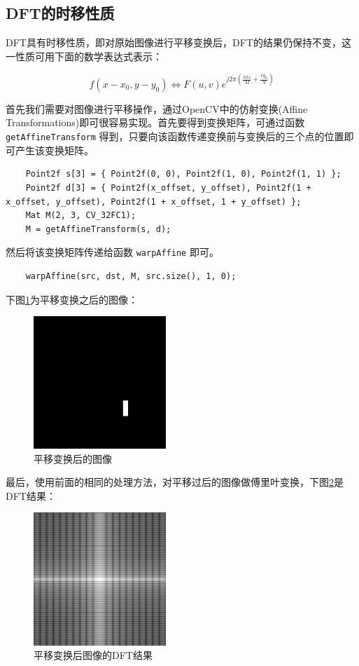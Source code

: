 \documentclass[hyperref,UTF8]{ctexart}
\begin{document}
\subsection{DFT的时移性质}


DFT具有时移性质，即对原始图像进行平移变换后，DFT的结果仍保持不变，这一性质可用下面的数学表达式表示：

\begin{equation}
f(x-x_0,y-y_0) \Leftrightarrow F(u,v)e^{j2 \pi (\frac{ux_0}{M} + \frac{vy_0}{N})}
\end{equation}

首先我们需要对图像进行平移操作，通过OpenCV中的仿射变换(Affine Transformations)即可很容易实现。首先要得到变换矩阵，可通过函数\lstinline{getAffineTransform} 得到，只要向该函数传递变换前与变换后的三个点的位置即可产生该变换矩阵。

\begin{lstlisting}
	Point2f s[3] = { Point2f(0, 0), Point2f(1, 0), Point2f(1, 1) };
	Point2f d[3] = { Point2f(x_offset, y_offset), Point2f(1 + x_offset, y_offset), Point2f(1 + x_offset, 1 + y_offset) };
	Mat M(2, 3, CV_32FC1);
	M = getAffineTransform(s, d);
\end{lstlisting}

然后将该变换矩阵传递给函数 \lstinline{warpAffine} 即可。

\begin{lstlisting}
	warpAffine(src, dst, M, src.size(), 1, 0);
\end{lstlisting}

下图\ref{fig:shift}为平移变换之后的图像：

\begin{figure}[H]
\centering
\includegraphics[width=5cm]{shift.png}
\caption{平移变换后的图像}
\label{fig:shift}
\end{figure}

最后，使用前面的相同的处理方法，对平移过后的图像做傅里叶变换，下图\ref{fig:shiftDFT}是DFT结果：

\begin{figure}[H]
\centering
\includegraphics[width=5cm]{shiftDFT.PNG}
\caption{平移变换后图像的DFT结果}
\label{fig:shiftDFT}
\end{figure}
\end{document}
